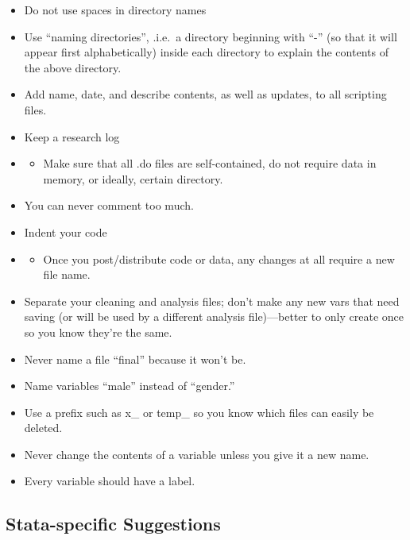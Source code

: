 \documentclass[12pt] {article}
\begin{document}
\begin{itemize}
\item
  Do not use spaces in directory names
\item
  Use ``naming directories'', .i.e.~a directory beginning with ``-'' (so
  that it will appear first alphabetically) inside each directory to
  explain the contents of the above directory.
\item
  Add name, date, and describe contents, as well as updates, to all
  scripting files.
\item
  Keep a research log
\item
  \begin{itemize}
  \item
    Make sure that all .do files are self-contained, do not require data
    in memory, or ideally, certain directory.
  \end{itemize}
\item
  You can never comment too much.
\item
  Indent your code
\item
  \begin{itemize}
  \item
    Once you post/distribute code or data, any changes at all require a
    new file name.
  \end{itemize}
\item
  Separate your cleaning and analysis files; don't make any new vars
  that need saving (or will be used by a different analysis
  file)---better to only create once so you know they're the same.
\item
  Never name a file ``final'' because it won't be.
\item
  Name variables ``male'' instead of ``gender.''
\item
  Use a prefix such as x\_ or temp\_ so you know which files can easily
  be deleted.
\item
  Never change the contents of a variable unless you give it a new name.
\item
  Every variable should have a label.
\end{itemize}

\subsection{Stata-specific
Suggestions}\label{stata-specific-suggestions}
\end{document}
